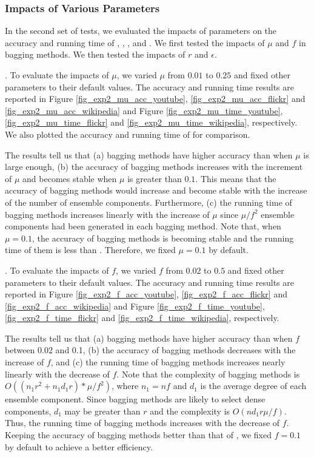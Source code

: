 \subsubsection{Impacts of Various Parameters}
In the second set of tests, we evaluated the impacts of parameters on
the accuracy and running time of \NMF, \Node, \Edge, \Biased and \BIGCLAM. We first
tested the impacts of $\mu$ and $f$ in bagging methods. We then
tested the impacts of $r$ and $\epsilon$.



. To evaluate the impacts of $\mu$, we
varied $\mu$ from $0.01$ to $0.25$ and fixed other parameters to their
default values. The accuracy and running time results are reported in
Figure \ref{fig_exp2_mu_acc_youtube}, \ref{fig_exp2_mu_acc_flickr} and
\ref{fig_exp2_mu_acc_wikipedia} and Figure \ref{fig_exp2_mu_time_youtube},
\ref{fig_exp2_mu_time_flickr} and \ref{fig_exp2_mu_time_wikipedia},
respectively. We also plotted the accuracy and running time of \NMF for comparison.




The results tell us that (a) bagging methods have higher accuracy than
\NMF when $\mu$ is large enough, (b) the accuracy of bagging methods
increases with the increment of $\mu$ and becomes stable when $\mu$ is greater
than $0.1$. This means that the accuracy of bagging methods would increase and become stable with
the increase of the number of ensemble components. Furthermore,
(c) the running time of bagging methods increases linearly
with the increase of $\mu$ since $\mu / f^2$ ensemble components had been generated in each bagging
method. Note that, when $\mu = 0.1$, the accuracy of bagging methods
is becoming stable and the running time of them is less than
\NMF. Therefore, we fixed $\mu = 0.1$ by default.




. To evaluate the impacts of $f$, we
varied $f$ from $0.02$ to $0.5$ and fixed other parameters to their
default values. The accuracy and running time results are reported in
Figure \ref{fig_exp2_f_acc_youtube}, \ref{fig_exp2_f_acc_flickr} and
\ref{fig_exp2_f_acc_wikipedia} and Figure \ref{fig_exp2_f_time_youtube},
\ref{fig_exp2_f_time_flickr} and \ref{fig_exp2_f_time_wikipedia}, respectively.



The results tell us that (a) bagging methods have higher accuracy
than \NMF when $f$ between 0.02 and 0.1, (b) the accuracy of bagging methods decreases
with the increase of $f$, and (c) the running time of bagging methods increases
nearly linearly with the decrease of $f$. Note that the complexity of bagging methods is
$O((n_{1}r^2 + n_{1}d_{1}r)*\mu /f^2)$, where $n_1 = nf$ and $d_1$ is the average degree of
each ensemble component. Since bagging methods are likely to select dense components, $d_1$
may be greater than $r$ and the complexity is $O(nd_1r\mu /f)$. Thus, the running time
of bagging methods increases with the decrease of $f$. Keeping the accuracy of bagging
methods better than that of \NMF, we fixed $f = 0.1$ by default to achieve a better efficiency.

